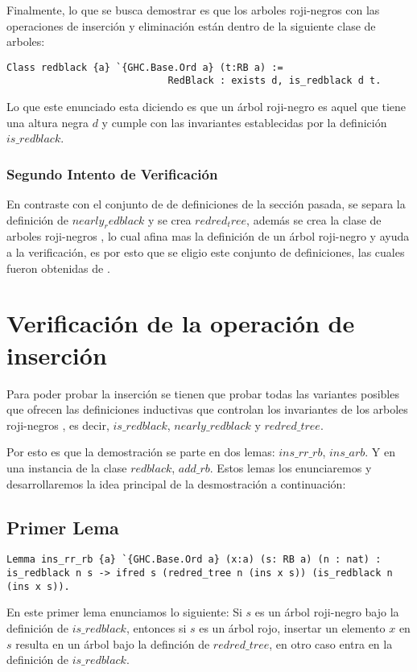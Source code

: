 \documentclass[letterpaper,12pt,oneside]{book}
\newcommand{\arn}{árbol roji-negro }
\newcommand{\arns}{arboles roji-negros }
\theoremstyle{plain}
\theoremstyle{definition}
\theoremstyle{remark}
\begin{document}
Finalmente, lo que se busca demostrar es que los \arns con las operaciones de inserci\'on y eliminaci\'on están dentro de la siguiente clase de arboles:

\begin{verbatim}
Class redblack {a} `{GHC.Base.Ord a} (t:RB a) := 
                            RedBlack : exists d, is_redblack d t.
\end{verbatim}

Lo que este enunciado esta diciendo es que un \arn es aquel que tiene una altura negra $d$ y cumple con las invariantes establecidas por la definici\'on 
$is\_redblack$.

\subsubsection{Segundo Intento de Verificaci\'on}
En contraste con el conjunto de de definiciones de la secci\'on pasada, se separa la definici\'on de $nearly_redblack$ y se crea $redred_tree$, además se crea la clase de \arns, lo cual afina mas la definici\'on de un \arn y ayuda a la verificaci\'on, es por esto que se eligio este conjunto de definiciones, las cuales fueron obtenidas de \cite{MSetRBT}.
\section{Verificación de la operación de inserción}

Para poder probar la inserci\'on se tienen que probar todas las variantes posibles que ofrecen las definiciones inductivas
que controlan los invariantes de los \arns, es decir, $is\_redblack$, $nearly\_redblack$ y $redred\_tree$.

Por esto es que la demostraci\'on se parte en dos lemas: $ins\_rr\_rb$, $ins\_arb$. Y en una instancia\cite{classes} de la clase $redblack$, $add\_rb$. Estos lemas los enunciaremos
y desarrollaremos la idea principal de la desmostraci\'on a continuaci\'on:

\subsection{Primer Lema}

\begin{verbatim}
Lemma ins_rr_rb {a} `{GHC.Base.Ord a} (x:a) (s: RB a) (n : nat) :
is_redblack n s -> ifred s (redred_tree n (ins x s)) (is_redblack n (ins x s)).
\end{verbatim}
 En este primer lema enunciamos lo siguiente: Si $s$ es un \arn bajo la definici\'on de $is\_redblack$, entonces 
 si $s$ es un \'arbol rojo, insertar un elemento $x$ en $s$ resulta en un \'arbol bajo la definci\'on de 
 $redred\_tree$, en otro caso entra en la definici\'on de $is\_redblack$.
\end{document}
